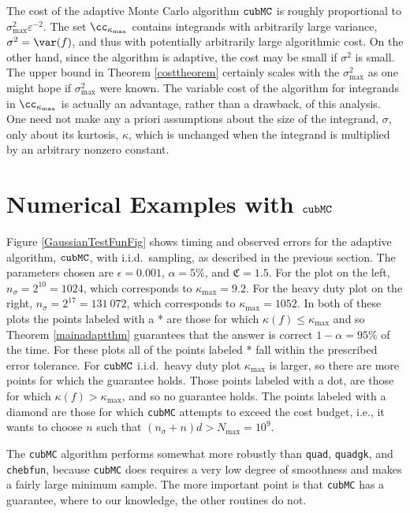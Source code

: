 \documentclass[graybox]{svmult}
\newcommand{\fudge}{\mathfrak{C}}
\newcommand{\aMC}{{\tt cubMC}\xspace}
\begin{document}
The cost of the adaptive Monte Carlo algorithm $\aMC$ is roughly proportional to $\sigma^2_{\max}\varepsilon^{-2}$.  The set $\cc_{\kappa_{\max}}$ contains integrands with arbitrarily large variance, $\sigma^2=\var(f)$, and thus with potentially arbitrarily large algorithmic cost.  On the other hand, since the algorithm is adaptive, the cost may be small if $\sigma^2$ is small.  The upper bound in Theorem \ref{costtheorem} certainly scales with the $\sigma^2_{\max}$ as one might hope if $\sigma^2_{\max}$ were known.  The variable cost of the algorithm for integrands in $\cc_{\kappa_{\max}}$ is actually an advantage, rather than a drawback, of this analysis.  One need not make any a priori assumptions about the size of the integrand, $\sigma$, only about its kurtosis, $\kappa$, which is unchanged when the integrand is multiplied by an arbitrary nonzero constant.

\section{Numerical Examples with $\aMC$} \label{numerexsec}

Figure \ref{GaussianTestFunFig} shows timing and observed errors for the adaptive algorithm, $\aMC$, with i.i.d.\ sampling, as described in the previous section.  The parameters chosen are $\epsilon=0.001$, $\alpha=5\%$, and  $\fudge=1.5$.  For the plot on the left, $n_\sigma=2^{10}=1024$, which corresponds to  $\kappa_{\max}=9.2$.  For the heavy duty plot on the right, $n_\sigma=2^{17}=131\ 072$, which corresponds to  $\kappa_{\max}=1052$. In both of these plots the points labeled with a * are those for which $\kappa(f) \le \kappa_{\max}$ and so Theorem \ref{mainadaptthm} guarantees that the answer is correct $1-\alpha= 95\%$ of the time.  For these plots all of the points labeled * fall within the prescribed error tolerance.  For $\aMC$ i.i.d.\ heavy duty plot $\kappa_{\max}$ is larger, so there are more points for which the guarantee holds.  Those points labeled with a dot, are those for which $\kappa(f) > \kappa_{\max}$, and so no guarantee holds. The points labeled with a diamond are those for which \aMC attempts to exceed the cost budget, i.e., it wants to choose $n$ such that $(n_{\sigma}+n)d > N_{\max}=10^9$. 

The {\tt cubMC} algorithm performs somewhat more robustly than {\tt quad}, {\tt quadgk}, and {\tt chebfun}, because \aMC does requires a very low degree of smoothness and makes a fairly large minimum sample.  The more important point is that \aMC has a guarantee, where to our knowledge, the other routines do not.
\end{document}
